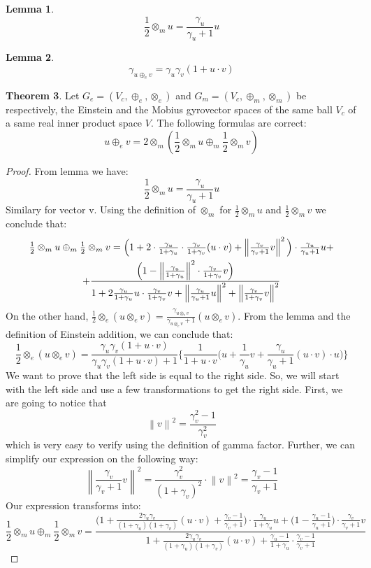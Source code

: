 \documentclass[a4paper]{article}
\theoremstyle{definition}
\newtheorem{theorem}{Theorem}[section]
\newtheorem{lemma}[theorem]{Lemma}
\newcommand{\norm}[1]{\left\lVert#1\right\rVert}
\begin{document}
\begin{lemma}$$\frac{1}{2}\otimes_m u = \frac{\gamma_u}{\gamma_u + 1} u$$
\end{lemma}

\begin{lemma}$$\gamma_{u\oplus_e v} = \gamma_u\gamma_v(1+u\cdot v)$$
\end{lemma}
\begin{theorem}Let $G_e=(V_c, \oplus_e, \otimes_e)$ and $G_m=(V_c, \oplus_m, \otimes_m)$ be respectively, the Einstein and the Mobius gyrovector spaces of the same ball $V_c$ of a same real inner product space $V$.
The following formulas are correct:
$$u\oplus_e v = 2\otimes_m (\frac{1}{2}\otimes_m u \oplus_m \frac{1}{2} \otimes_m v)$$
\end{theorem}
\begin{proof}From lemma we have:
$$\frac{1}{2}\otimes_m u = \frac{\gamma_u}{\gamma_u + 1} u$$
Similary for vector v. Using the definition of $\otimes_m$ for $\frac{1}{2}\otimes_m u$ and $\frac{1}{2}\otimes_m v$ we conclude that:
\begin{multline}
$$\frac{1}{2}\otimes_m u \oplus_m \frac{1}{2} \otimes_m v = \Big(1 + 2\cdot\frac{\gamma_u}{1+\gamma_u}\cdot\frac{\gamma_v}{1+\gamma_v}(u\cdot v) + \norm{\frac{\gamma_v}{\gamma_v+1}v}^2\Big) \cdot \frac{\gamma_u}{\gamma_u + 1}u + \\ + \frac{\Big(1-\norm{\frac{\gamma_u}{1+\gamma_u}}^2\cdot \frac{\gamma_v}{1+\gamma_v}v\Big)}{1+2\frac{\gamma_u}{1+\gamma_u}u \cdot \frac{\gamma_v}{1+\gamma_v}v + \norm{\frac{\gamma_u}{\gamma_u+1}u}^2 + \norm{\frac{\gamma_v}{1+\gamma_v}v}^2} $$
\end{multline}
On the other hand, $\frac{1}{2}\otimes_e (u \otimes_e v) = \frac{\gamma_{u \otimes_e v}}{\gamma_{u \otimes_e v} + 1}(u \otimes_e v)$. From the lemma and the definition of Einstein addition, we can conclude that:
$$\frac{1}{2}\otimes_e (u \otimes_e v) = \frac{\gamma_u \gamma_v (1+u\cdot v)}{\gamma_u \gamma_v (1+u\cdot v) + 1}\Big\{\frac{1}{1+u\cdot v}\Big( u +\frac{1}{\gamma_u}v + \frac{\gamma_u}{\gamma_u + 1}(u\cdot v)\cdot u \Big)\Big\}$$
We want to prove that the left side is equal to the right side. So, we will start with the left side and use a few transformations to get the right side.
First, we are going to notice that $$\norm{v}^2 = \frac{\gamma_v^2-1}{\gamma_v^2}$$ which is very easy to verify using the definition of gamma factor. Further, we can simplify our expression on the following way:
$$\norm{\frac{\gamma_v}{\gamma_v+1}v}^2 =\frac{\gamma_v^2}{(1+\gamma_v)^2}\cdot\norm{v}^2 = \frac{\gamma_v-1}{\gamma_v+1}$$
Our expression transforms into:
$$\frac{1}{2}\otimes_m u \oplus_m \frac{1}{2} \otimes_m v = \frac{\Big(1+\frac{2\gamma_u\gamma_v}{(1+\gamma_u)(1+\gamma_v)}(u\cdot v) + \frac{\gamma_v -1}{\gamma_v+1}\Big)\cdot \frac{\gamma_u}{1+\gamma_u}u + \Big(1-\frac{\gamma_u-1}{\gamma_u+1}\Big)\cdot \frac{\gamma_v}{\gamma_v+1}v}{1 + \frac{2\gamma_u\gamma_v}{(1+\gamma_u)(1+\gamma_v)}(u\cdot v)+\frac{\gamma_u-1}{1+\gamma_u}\cdot\frac{\gamma_v-1}{\gamma_v+1}}$$


\end{proof}
\end{document}
